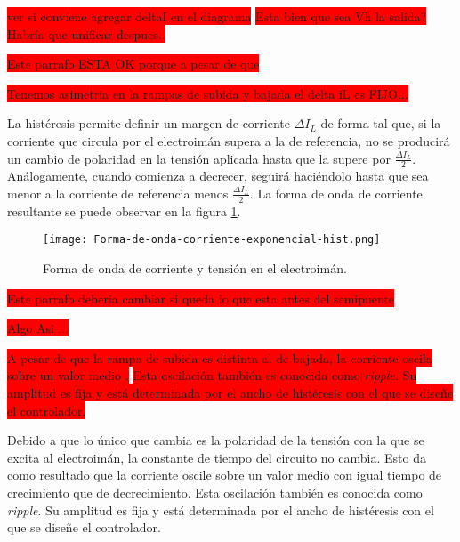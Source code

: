 \colorbox{red}{ver si conviene agregar deltaI en el diagrama}
\colorbox{red}{Esta bien que sea Vh la salida? Habría que unificar despues..}


\colorbox{red}{Este parrafo ESTA OK porque a pesar de que}

\colorbox{red}{Tenemos asimetria en la rampas de subida y bajada el delta iL es FIJO...}

La histéresis permite definir un margen de corriente $\Delta I_L$ de forma tal que, si la corriente que circula por el electroimán supera a la de referencia, no se producirá un cambio de polaridad en la tensión aplicada hasta que la supere por $\frac{\Delta I_L}{2}$. Análogamente, cuando comienza a decrecer, seguirá haciéndolo hasta que sea menor a la corriente de referencia menos $\frac{\Delta I_L}{2}$. La forma de onda de corriente resultante se puede observar en la figura \ref{fig:img_corriente_exponencial-hist}.

\begin{figure}[H]
	\centering
	\texttt{[image: Forma-de-onda-corriente-exponencial-hist.png]}
	\caption{Forma de onda de corriente y tensión en el electroimán.}
	\label{fig:img_corriente_exponencial-hist}
\end{figure}



\colorbox{red}{Este parrafo deberia cambiar si queda lo que esta antes del semipuente}

\colorbox{red}{Algo Asi ...}

\colorbox{red}{A pesar de que la rampa de subida es distinta al de bajada, la corriente oscila sobre un valor medio .}
\colorbox{red}{ Esta oscilación también es conocida como \textsl{ripple}. Su amplitud es fija y está determinada por el ancho de histéresis con el que se diseñe el controlador. }

Debido a que lo único que cambia es la polaridad de la tensión con la que se excita al electroimán, la constante de tiempo del circuito no cambia. Esto da como resultado  que la corriente oscile sobre un valor medio con igual tiempo de crecimiento que de decrecimiento. Esta oscilación también es conocida como \textsl{ripple}. Su amplitud es fija y está determinada por el ancho de histéresis con el que se diseñe el controlador. 

